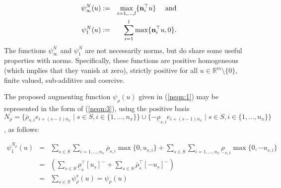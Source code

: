 \documentclass[preprint, 1p, review]{elsarticle}
\begin{document}
%
\begin{eqnarray}\label{eq:penFinf}
\psi_{\infty}^{N}(u) &:=& \max_{i=1,\dots,l} \{ \text{\bf n}_i^\top u \} \quad \text{ and}  \label{neqn:2}\\
\label{eq:penFone}
\psi_{1}^{N}(u) &:=& \sum_{i=1}^{l} \max \{ \text{\bf n}_i^\top u, 0 \}. \label{neqn:3}
\end{eqnarray}
The functions $\psi_{\infty}^{N}$ and $\psi_{1}^{N}$ are not necessarily norms, but do share some useful properties with norms. Specifically, these functions are positive homogeneous (which implies that they vanish at zero), strictly positive for all $u \in \mathbb{R}^{m} \setminus \{0\}$, finite valued, sub-additive and coercive.

The proposed augmenting function $\psi_\rho(u)$ given in (\ref{neqn:1}) may be represented in the form of (\ref{neqn:3}), using the positive basis $N_\rho = \{\overline{\rho}_{s,i} e_{i+(s-1)n_x} \mid s \in S, i \in \{1,\dots,{n_x}\} \} \cup \{- \underline{\rho}_{s,i} e_{i+(s-1)n_x} \mid s \in S, i \in \{1,\dots,{n_x}\} \}$, as follows:



\begin{eqnarray}
\psi_{1}^{N_\rho}(u) &=& \sum_{s \in S} \sum_{i=1,\dots,{n_x}} \overline{\rho}_{s,i}  \max\{0, u_{s,i}\} + \sum_{s \in S}\sum_{i=1,\dots,{n_x}}  \underline{\rho}_{s,i}  \max\{0, -u_{s,i}\} \nonumber \\
&=& \left(\sum_{s \in S}\underline{\rho}_s^\top[u_s]^- +  \sum_{s \in S}\overline{\rho}_s^\top [ - u_s]^-\right) \label{equation:phi-mu-represented-as-phi-1}\\
&=& \sum_{s \in S} \psi_{\rho}^s(u) = \psi_\rho(u) \nonumber
\end{eqnarray}

\end{document}
